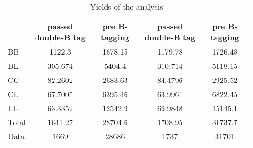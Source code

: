\documentclass[10pt]{article}
\begin{document}
\begin{table}[htbp]
\begin{center}
\begin{tabular}{|l|S|S|S|S|}
\hline 
 & {passed double-B tag} & {pre B-tagging} & {passed double-B tag} & {pre B-tagging}\\
\hline 
  BB   & 1122.3  & 1678.15  & 1179.78  & 1726.48  \\ 
  BL   & 305.674  & 5404.4  & 310.714  & 5118.15  \\ 
  CC   & 82.2602  & 2683.63  & 84.4796  & 2925.52  \\ 
  CL   & 67.7005  & 6395.46  & 63.9961  & 6822.45  \\ 
  LL   & 63.3352  & 12542.9  & 69.9848  & 15145.1  \\ 
\hline 
  Total  & 1641.27  & 28704.6  & 1708.95  & 31737.7  \\ 
\hline 
  Data   & 1669 & 28686 & 1737 & 31701 \\ 
\hline 
\end{tabular} 
\caption{Yields of the analysis} 
\end{center} 
\end{table} 
\end{document}
